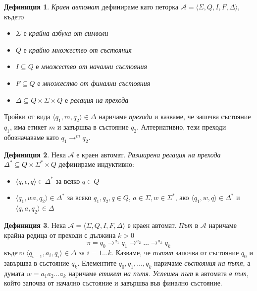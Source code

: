 \documentclass[12pt, oneside]{article}
\theoremstyle{definition}
\newtheorem{definition}{Дефиниция}[section]
\begin{document}
\begin{definition}
	\emph{Краен автомат} дефинираме като петорка \( \mathcal{A} = \langle \Sigma, Q, I, F, \Delta \rangle \), където

	\begin{itemize}
		\item \( \Sigma \) е \emph{крайна азбука от символи}
		\item \( Q \) е \emph{крайно множество от състояния}
		\item \( I \subseteq Q \) е \emph{множество от начални състояния}
		\item \( F \subseteq Q \) е \emph{множество от финални състояния}
		\item \( \Delta \subseteq Q \times \Sigma \times Q \) е \emph{релация на прехода}
	\end{itemize}
 
	Тройки от вида \( \langle q_1, m, q_2 \rangle \in \Delta \) наричаме \emph{преходи} и казваме, че започва състояние \( q_1 \), има етикет \( m \) и завършва в състояние \( q_2 \). Алтернативно, тези преходи обозначаваме като \( q_1 \to^m q_2 \).
\end{definition}

\begin{definition}  
	Нека \( \mathcal{A} \) е краен автомат. \emph{Разширена релация на прехода} \( \Delta^* \subseteq Q \times \Sigma^* \times Q \) дефинираме индуктивно:

	\begin{itemize}
		\item \( \langle q, \epsilon, q \rangle \in \Delta^* \) за всяко \( q \in Q \)
		\item \( \langle q_1, wa, q_2 \rangle \in \Delta^* \) за всяко \( q_1, q_2, q \in Q \), \( a \in \Sigma, w \in \Sigma^* \), ако \( \langle q_1, w, q \rangle \in \Delta^* \) и \( \langle q, a, q_2 \rangle \in \Delta \)
	\end{itemize}
\end{definition}

\begin{definition} 
	Нека \( \mathcal{A} = \langle \Sigma, Q, I, F, \Delta \rangle \) е краен автомат. \emph{Път} в \( \mathcal{A} \) наричаме крайна редица от преходи с дължина \( k > 0 \) 
	\[ \pi = q_0 \to^{a_1} q_1 \to^{a_2} \ldots \to^{a_k} q_k \] 
	където \( \langle q_{i-1}, a_i, q_i \rangle \in \Delta \) за \( i = 1 \ldots k \). Казваме, че \emph{пътят} започва от състояние \( q_0 \) и завършва в състояние \( q_k \). Елементите \( q_0,q_1, \ldots ,q_k \) наричаме \emph{състояния на пътя}, а думата \( w = a_1 a_2 \ldots a_k \) наричаме \emph{етикет на пътя}. \newline \emph{Успешен път} в автомата е \emph{път}, който започва от начално състояние и завършва във финално състояние.
\end{definition}
\end{document}
